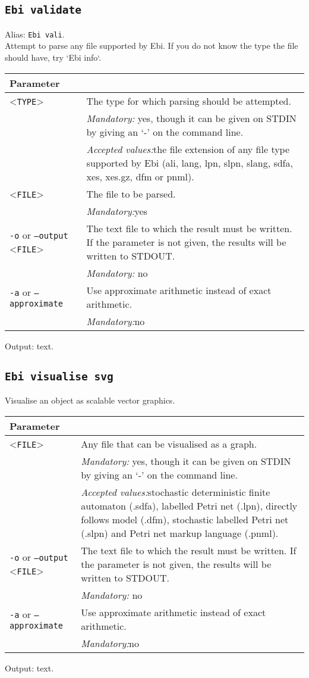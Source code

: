 {\subsection{\texttt{Ebi validate}}
\label{command:Ebi validate}
Alias: \texttt{Ebi vali}.\\
Attempt to parse any file supported by Ebi. If you do not know the type the file should have, try `Ebi info`.\\
\begin{tabularx}{\linewidth}{lX}
\toprule
Parameter \\\midrule
<\texttt{TYPE}>&The type for which parsing should be attempted.\\
&\textit{Mandatory:} \quad yes, though it can be given on STDIN by giving an `-' on the command line.\\
&\textit{Accepted values:}\quad the file extension of any file type supported by Ebi (ali, lang, lpn, slpn, slang, sdfa, xes, xes.gz, dfm or pnml).\\
<\texttt{FILE}>
&The file to be parsed.\\
&\textit{Mandatory:}\quad yes\\
\texttt{-o} or \texttt{--output} <\texttt{FILE}> &
The text file to which the result must be written. If the parameter is not given, the results will be written to STDOUT.\\
&\textit{Mandatory:} \quad no\\
\texttt{-a} or \texttt{--approximate} & Use approximate arithmetic instead of exact arithmetic.\\
&\textit{Mandatory:}\quad no\\
\bottomrule
\end{tabularx}
Output: text.
\subsection{\texttt{Ebi visualise svg}}
\label{command:Ebi visualise svg}
Visualise an object as scalable vector graphics.\\
\begin{tabularx}{\linewidth}{lX}
\toprule
Parameter \\\midrule
<\texttt{FILE}>&Any file that can be visualised as a graph.\\
&\textit{Mandatory:} \quad yes, though it can be given on STDIN by giving an `-' on the command line.\\
&\textit{Accepted values:}\quad stochastic deterministic finite automaton (.sdfa), labelled Petri net (.lpn), directly follows model (.dfm), stochastic labelled Petri net (.slpn) and Petri net markup language (.pnml).\\
\texttt{-o} or \texttt{--output} <\texttt{FILE}> &
The text file to which the result must be written. If the parameter is not given, the results will be written to STDOUT.\\
&\textit{Mandatory:} \quad no\\
\texttt{-a} or \texttt{--approximate} & Use approximate arithmetic instead of exact arithmetic.\\
&\textit{Mandatory:}\quad no\\
\bottomrule
\end{tabularx}
Output: text.
}
